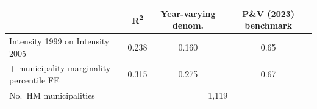 \begin{tabular}{lccc} \hline \hline
& \multicolumn{1}{c}{R\textsuperscript{2}} & \multicolumn{1}{c}{Year-varying denom.} & \multicolumn{1}{c}{P\&V (2023) benchmark} \\ \toprule
Intensity 1999 on Intensity 2005 & 0.238 & 0.160 & 0.65 \\ 
\quad + municipality marginality-percentile FE & 0.315 & 0.275 & 0.67 \\ 
\bottomrule
No.\ HM municipalities & \multicolumn{3}{c}{1,119} \\ 
\end{tabular}
